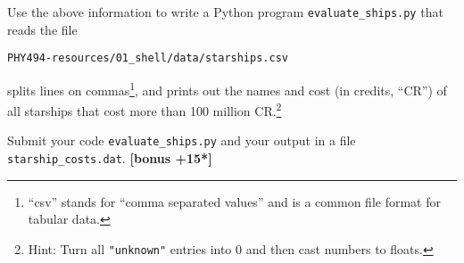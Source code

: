 \documentclass[letterpaper]{scrartcl}
\newcounter{TotalPoints}
\newcounter{TotalBonus}
\newcommand{\bonus}[1]{\textbf{[bonus +#1*]}\stepcounter{TotalBonus}}
\begin{document}
Use the above information to write a Python program
\texttt{evaluate\_ships.py} that reads the file
\begin{center}
  \texttt{PHY494-resources/01\_shell/data/starships.csv}
\end{center}
splits lines on commas\footnote{``csv'' stands for ``comma separated
  values'' and is a common file format for tabular data.}, and prints
out the names and cost (in credits, ``CR'') of all starships that cost
more than 100 million CR.\footnote{Hint: Turn all \texttt{"unknown"}
  entries into 0 and then cast numbers to floats.}

Submit your code \texttt{evaluate\_ships.py} and your output in a file
\texttt{starship\_costs.dat}.  \bonus{15}




\end{document}
